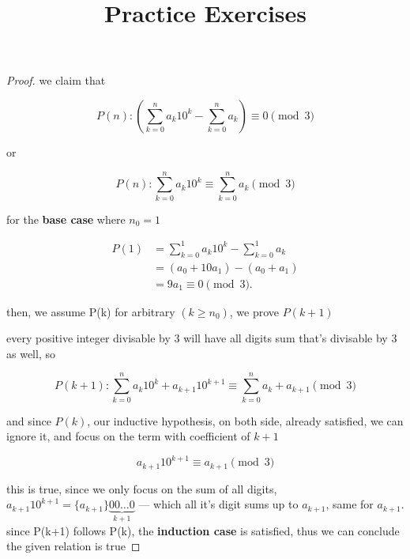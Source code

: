 \documentclass[11pt]{article}
\theoremstyle{definition}
\theoremstyle{remark}
\begin{document}
\title{Practice Exercises}
\date{}
\maketitle

\begin{proof}
    we claim that
    
    \[
        P(n): (\sum_{k=0}^{n} a_k 10^k - \sum_{k=0}^{n} a_k) \equiv 0 \pmod 3
    \]

    or

    \[
        P(n): \sum_{k=0}^{n} a_k 10^k \equiv \sum_{k=0}^{n} a_k \pmod 3
    \]

    for the \textbf{base case} where $n_0 = 1$

    \[
    \begin{aligned}
    P(1) &= \sum_{k=0}^{1} a_k 10^k - \sum_{k=0}^{1} a_k  \\
    &= (a_0 + 10a_1) - (a_0 + a_1) \\
    &= 9a_1 \equiv 0 \pmod{3}.
    \end{aligned}
    \]

    then, we assume P(k) for arbitrary $(k \ge n_0)$, we prove $P(k+1)$

    \vspace{1em}

    every positive integer divisable by 3 will have all digits sum that's divisable by 3 as well, so

    \[P(k+1): \sum_{k=0}^{n} a_k 10^k + a_{k+1}10^{k+1} \equiv \sum_{k=0}^{n} a_k + a_{k+1} \pmod 3\]

    and since $P(k)$, our inductive hypothesis, on both side, already satisfied, we can ignore it, and focus on the term with coefficient of $k+1$

    \[a_{k+1}10^{k+1} \equiv a_{k+1} \pmod 3\]

    this is true, since we only focus on the sum of all digits, $a_{k+1}10^{k+1} = \{a_{k+1}\}\underbrace{00\ldots 0}_{k+1}$ --- which all it's digit sums up to $a_{k+1}$, same for $a_{k+1}$. since P(k+1) follows P(k), the \textbf{induction case} is satisfied, thus we can conclude the given relation is true \end{proof}
\end{document}
